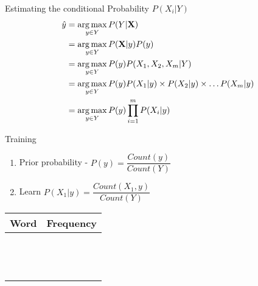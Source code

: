 \begin{frame}{Estimating the conditional Probability $P(X_i|Y)$}
\begin{align}
\hat{y} &=\operatorname*{\arg\max}_{y\in Y} P(Y|\textbf{X})\\
&=\operatorname*{\arg\max}_{y\in Y}P(\textbf{X}|y)P(y)\\
&=\operatorname*{\arg\max}_{y\in Y}P(y)P(X_1,X_2,X_m|Y)\\
&=\operatorname*{\arg\max}_{y\in Y}P(y)P(X_1|y)\times P(X_2|y)\times \ldots P(X_m|y)\\
&=\operatorname*{\arg\max}_{y\in Y}P(y)\prod_{i=1}^{m}P(X_i|y)
\end{align}
\end{frame}

\begin{frame}[shrink]{Training}
\begin{multicols}{2}
\begin{enumerate}
	\item Prior probability -
	$P(y) = \dfrac{Count(y)}{Count(Y)}$
	\item Learn $P(X_1|y) = \dfrac{Count(X_1,y)}{Count(Y)}$
\end{enumerate}
\begin{table}
	\begin{tabular}{|p{3cm}|p{3cm}|}
		\hline
		Word&Frequency\\
		\hline
		&\\
		&\\
		&\\
		&\\
		&\\
		&\\
		&\\
		&\\
		&\\
		&\\
		&\\
		&\\
		&\\
		\hline
	\end{tabular}
\end{table}
\end{multicols}

\end{frame}

